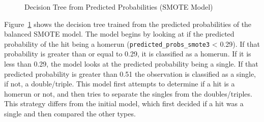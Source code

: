 \documentclass[
  letterpaper,
  DIV=11,
  numbers=noendperiod]{scrartcl}
\begin{document}
\begin{figure}[H]


\caption{\label{fig-smote-pred-dectree}Decision Tree from Predicted
Probabilities (SMOTE Model)}

\end{figure}%

Figure~\ref{fig-smote-pred-dectree} shows the decision tree trained from
the predicted probabilities of the balanced SMOTE model. The model
begins by looking at if the predicted probability of the hit being a
homerun (\texttt{predicted\_probs\_smote3} \textless{} 0.29). If that
probability is greater than or equal to 0.29, it is classified as a
homerun. If it is less than 0.29, the model looks at the predicted
probability being a single. If that predicted probability is greater
than 0.51 the observation is classified as a single, if not, a
double/triple. This model first attempts to determine if a hit is a
homerun or not, and then tries to separate the singles from the
doubles/triples. This strategy differs from the initial model, which
first decided if a hit was a single and then compared the other types.
\end{document}
